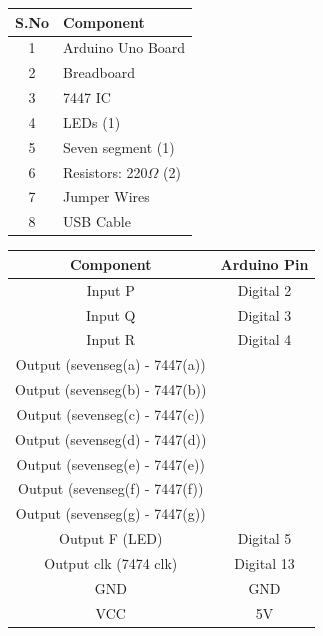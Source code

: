 \documentclass[a4paper,12pt]{article}
\begin{document}
\begin{center}
\begin{minipage}{0.45\textwidth}
\begin{table}[H]
\centering
\begin{tabular}{|c|l|}
\hline
\textbf{S.No} & \textbf{Component} \\ \hline
1 & Arduino Uno Board \\
2 & Breadboard \\
3 & 7447 IC  \\
4 & LEDs (1) \\
5 & Seven segment (1) \\
6 & Resistors: 220$\Omega$ (2) \\
7 & Jumper Wires \\
8 & USB Cable \\
\hline
\end{tabular}
\end{table}
\end{minipage}
\hspace{0.05\textwidth}
\begin{minipage}{0.45\textwidth}
\begin{table}[H]
\centering
\begin{tabular}{|c|c|}
\hline
\textbf{Component} & \textbf{Arduino Pin} \\ \hline
Input P  & Digital 2 \\
Input Q  & Digital 3 \\
Input R  & Digital 4 \\
Output (sevenseg(a) - 7447(a))\\
Output (sevenseg(b) - 7447(b))\\
Output (sevenseg(c) - 7447(c))\\
Output (sevenseg(d) - 7447(d))\\
Output (sevenseg(e) - 7447(e))\\
Output (sevenseg(f) - 7447(f))\\
Output (sevenseg(g) - 7447(g))\\ 
Output F (LED) & Digital 5 \\
Output clk (7474 clk) & Digital 13 \\
GND & GND \\
VCC & 5V \\
\hline
\end{tabular}
\end{table}
\end{minipage}
\end{center}
\end{document}
